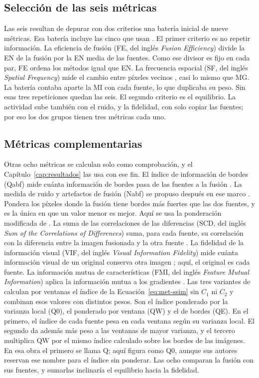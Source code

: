 \subsection{Selección de las seis métricas}

Las seis resultan de depurar con dos criterios una batería inicial de nueve métricas. Esa batería
incluye las cinco que usan \textcite{ortegarodriguez2025}. El primer criterio es no repetir información. La
eficiencia de fusión (FE, del inglés \textit{Fusion Efficiency}) divide la EN de la fusión por la EN
media de las fuentes. Como ese divisor es fijo en cada par, FE ordena los métodos igual que EN. La
frecuencia espacial (SF, del inglés \textit{Spatial Frequency}) mide el cambio entre píxeles vecinos
\parencite{eskicioglu1995}, casi lo mismo que MG. La batería contaba aparte la MI con cada fuente, lo
que duplicaba su peso. Sin esas tres repeticiones quedan las seis. El segundo criterio es el equilibrio.
La actividad sube también con el ruido, y la fidelidad, con solo copiar las fuentes; por eso los dos
grupos tienen tres métricas cada uno.

\subsection{Métricas complementarias}

Otras ocho métricas se calculan solo como comprobación, y el Capítulo~\ref{cap:resultados} las usa con
ese fin. El índice de información de bordes (Qabf) mide cuánta información de bordes pasa de las fuentes
a la fusión \parencite{xydeas2000}. La medida de ruido y artefactos de fusión (Nabf) se propuso después en
ese marco \parencite{petrovic2005}. Pondera los píxeles donde la fusión tiene bordes más fuertes que las
dos fuentes, y es la única en que un valor menor es mejor. Aquí se usa la ponderación modificada de
\textcite{kumar2013}. La suma de las correlaciones de las diferencias (SCD, del inglés \textit{Sum of the
Correlations of Differences}) suma, para cada fuente, su correlación con la diferencia entre la imagen
fusionada y la otra fuente \parencite{aslantas2015}. La fidelidad de la información visual (VIF, del
inglés \textit{Visual Information Fidelity}) mide cuánta información visual de un original conserva otra
imagen \parencite{sheikh2006}; aquí, el original es cada fuente. La información mutua de
características (FMI, del inglés \textit{Feature Mutual Information}) aplica la información mutua a los
gradientes \parencite{haghighat2011}. Las tres variantes de \textcite{piella2003} calculan por
ventanas el índice de la Ecuación~\eqref{eq:met-ssim} sin $C_1$ ni $C_2$ y combinan esos valores con
distintos pesos. Son el índice ponderado por la varianza local (Q0), el ponderado por ventana (QW) y el
de bordes (QE). En el primero, el índice de cada fuente pesa en cada ventana según su varianza local. El
segundo da además más peso a las ventanas de mayor varianza, y el tercero multiplica QW por el mismo
índice calculado sobre los bordes de las imágenes. En esa obra el primero se llama Q; aquí figura como
Q0, aunque sus autores reservan ese nombre para el índice sin ponderar. Las ocho comparan la fusión con
sus fuentes, y sumarlas inclinaría el equilibrio hacia la fidelidad.

